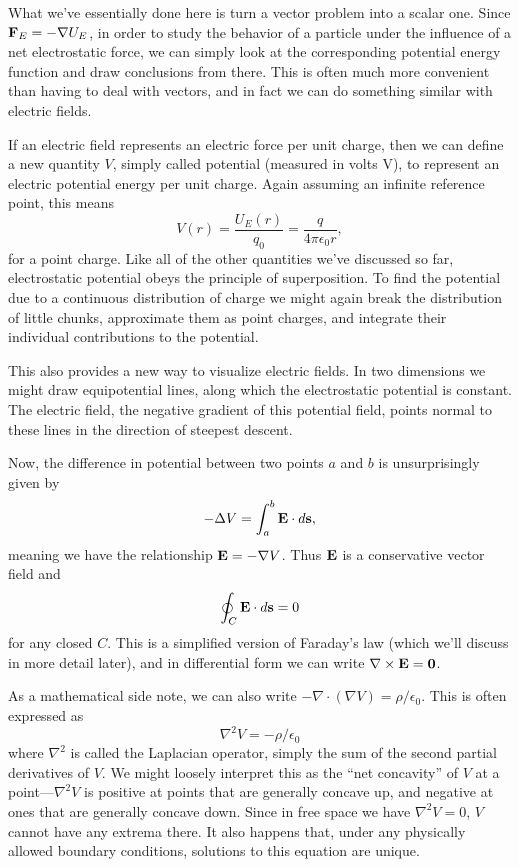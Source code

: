 \documentclass[../p051main.tex]{subfiles}
\begin{document}
What we've essentially done here is turn a vector problem into a scalar one.
Since $\mathbf{F}_E = -\nabla U_E$, in order to study the behavior of a particle under the influence of a net electrostatic force, we can simply look at the corresponding potential energy function and draw conclusions from there.
This is often much more convenient than having to deal with vectors, and in fact we can do something similar with electric fields.

If an electric field represents an electric force per unit charge, then we can define a new quantity $V$, simply called potential (measured in volts V), to represent an electric potential energy per unit charge.
Again assuming an infinite reference point, this means
\[ V(r) = \frac{U_E(r)}{q_0} = \frac{q}{4\pi \epsilon_0 r}, \]
for a point charge.
Like all of the other quantities we've discussed so far, electrostatic potential obeys the principle of superposition.
To find the potential due to a continuous distribution of charge we might again break the distribution of little chunks, approximate them as point charges, and integrate their individual contributions to the potential.

This also provides a new way to visualize electric fields.
In two dimensions we might draw equipotential lines, along which the electrostatic potential is constant.
The electric field, the negative gradient of this potential field, points normal to these lines in the direction of steepest descent.

Now, the difference in potential between two points $a$ and $b$ is unsurprisingly given by
\[ -\Delta V = \int_a^b \mathbf{E} \cdot d\mathbf{s}, \]
meaning we have the relationship $\mathbf{E} = -\nabla V$.
Thus $\mathbf{E}$ is a conservative vector field and
\[ \oint_C \mathbf{E} \cdot d\mathbf{s} = 0 \]
for any closed $C$.
This is a simplified version of Faraday's law (which we'll discuss in more detail later), and in differential form we can write $\nabla \times \mathbf{E} = \mathbf{0}$.

As a mathematical side note, we can also write $-\nabla \cdot (\nabla V) = \rho / \epsilon_0$.
This is often expressed as
\[ \nabla^2 V = -\rho / \epsilon_0 \]
where $\nabla^2$ is called the Laplacian operator, simply the sum of the second partial derivatives of $V$.
We might loosely interpret this as the ``net concavity'' of $V$ at a point---$\nabla^2 V$ is positive at points that are generally concave up, and negative at ones that are generally concave down.
Since in free space we have $\nabla^2 V = 0$, $V$ cannot have any extrema there.
It also happens that, under any physically allowed boundary conditions, solutions to this equation are unique.
\end{document}
